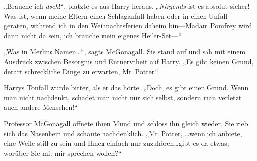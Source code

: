 „Brauche ich \emph{doch}!“, platzte es aus Harry heraus. \emph{„Nirgends} ist es absolut sicher! Was ist, wenn meine Eltern einen Schlaganfall haben oder in einen Unfall geraten, während ich in den Weihnachtsferien daheim bin—Madam Pomfrey wird dann nicht da sein, ich brauche mein eigenes Heiler-Set—“

„Was in Merlins Namen…“, sagte McGonagall. Sie stand auf und sah mit einem Ausdruck zwischen Besorgnis und Entnervtheit auf Harry. „Es gibt keinen Grund, derart schreckliche Dinge zu erwarten, Mr~Potter.“

Harrys Tonfall wurde bitter, als er das hörte. „Doch, es gibt einen Grund. Wenn man nicht nachdenkt, schadet man nicht nur sich selbst, sondern man verletzt auch andere Menschen!“

Professor McGonagall öffnete ihren Mund und schloss ihn gleich wieder. Sie rieb sich das Nasenbein und schaute nachdenklich. „Mr~Potter, …wenn ich anbiete, eine Weile still zu sein und Ihnen einfach nur zuzuhören…gibt es da etwas, worüber Sie mit mir sprechen wollen?“

